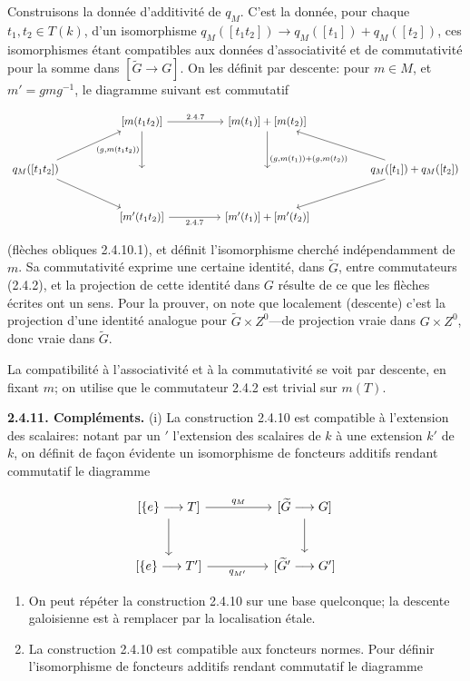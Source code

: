 \documentclass[10pt,a4paper]{article}
\begin{document}
Construisons la donnée d'additivité de \(q_M\). C'est la donnée, pour chaque \(t_1,t_2\in T(k)\), d'un isomorphisme \(q_M([t_1t_2])\to q_M([t_1])+q_M([t_2])\), ces isomorphismes étant compatibles aux données d'associativité et de commutativité pour la somme dans \([\widetilde G\to G]\). On les définit par descente: pour \(m\in M\), et \(m'=gmg^{-1}\), le diagramme suivant est commutatif

\[
\begin{tikzcd}[column sep=huge,row sep=large]
& {[m(t_1t_2)]} \arrow[r,"2.4.7"] \arrow[d,"{(g,m(t_1t_2))}"'] & {[m(t_1)]+[m(t_2)]} \arrow[d,"{(g,m(t_1))+(g,m(t_2))}"{pos=0.75}] & \\
q_M([t_1t_2]) \arrow[ur] \arrow[dr] & {} & {} & q_M([t_1])+q_M([t_2]) \arrow[ul] \arrow[dl] \\
& {[m'(t_1t_2)]} \arrow[r,"2.4.7"'] & {[m'(t_1)]+[m'(t_2)]} &
\end{tikzcd}
\]

(flèches obliques 2.4.10.1), et définit l'isomorphisme cherché indépendamment de \(m\). Sa commutativité exprime une certaine identité, dans \(\widetilde G\), entre commutateurs (2.4.2), et la projection de cette identité dans \(G\) résulte de ce que les flèches écrites ont un sens. Pour la prouver, on note que localement (descente) c'est la projection d'une identité analogue pour \(\widetilde G\times Z^0\)---de projection vraie dans \(G\times Z^0\), donc vraie dans \(\widetilde G\).

La compatibilité à l'associativité et à la commutativité se voit par descente, en fixant \(m\); on utilise que le commutateur 2.4.2 est trivial sur \(m(T)\).

\textbf{2.4.11. Compléments.} (i) La construction 2.4.10 est compatible à l'extension des scalaires: notant par un \('\) l'extension des scalaires de \(k\) à une extension \(k'\) de \(k\), on définit de façon évidente un isomorphisme de foncteurs additifs rendant commutatif le diagramme

\[
\begin{tikzcd}[column sep=huge,row sep=large]
{[\{e\}\longrightarrow T]} \arrow[r,"q_M"] \arrow[d] & {[\widetilde G\longrightarrow G]} \arrow[d] \\
{[\{e\}\longrightarrow T']} \arrow[r,"q_{M'}"'] & {[\widetilde G'\longrightarrow G']}
\end{tikzcd}
\]

\begin{enumerate}
\def\labelenumi{(\roman{enumi})}
\setcounter{enumi}{1}
\item
  On peut répéter la construction 2.4.10 sur une base quelconque; la descente galoisienne est à remplacer par la localisation étale.
\item
  La construction 2.4.10 est compatible aux foncteurs normes. Pour définir l'isomorphisme de foncteurs additifs rendant commutatif le diagramme
\end{enumerate}
\end{document}
